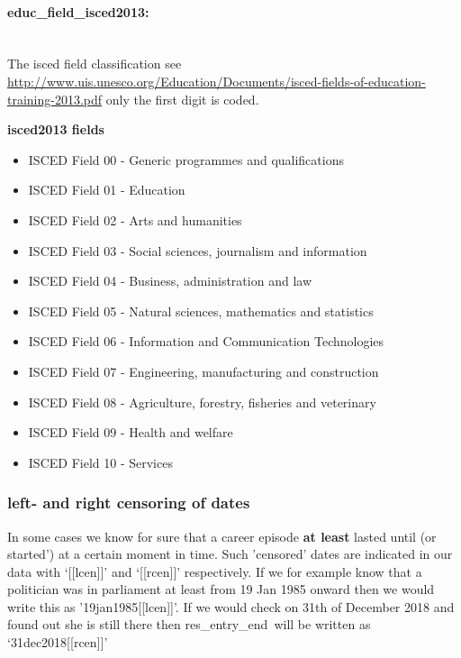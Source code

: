 \documentclass{article}
\begin{document}
\paragraph{educ\_field\_isced2013:}\\ 
    The isced field classification see \url{http://www.uis.unesco.org/Education/Documents/isced-fields-of-education-training-2013.pdf} only the first digit is coded.\par

    \textbf{isced2013 fields}
    \begin{itemize}
    \setlength\itemsep{0em}
        \item ISCED Field 00 - Generic programmes and qualifications
        \item ISCED Field 01 - Education
        \item ISCED Field 02 - Arts and humanities
        \item ISCED Field 03 - Social sciences, journalism and information
        \item ISCED Field 04 - Business, administration and law
        \item ISCED Field 05 - Natural sciences, mathematics and statistics
        \item ISCED Field 06 - Information and Communication Technologies
        \item ISCED Field 07 - Engineering, manufacturing and construction
        \item ISCED Field 08 - Agriculture, forestry, fisheries and veterinary
        \item ISCED Field 09 - Health and welfare
        \item ISCED Field 10 - Services
    \end{itemize}

\subsubsection{left- and right censoring of dates}

    In some cases we know for sure that a career episode \textbf{at least} lasted until (or started') at a certain moment in time. Such 'censored' dates are indicated in our data with `[[lcen]]' and `[[rcen]]' respectively. If we for example know that a politician was in parliament at least from 19 Jan 1985 onward then we would write this as '19jan1985[[lcen]]'. If we would check on 31th of December 2018 and found out she is still there then res\_entry\_end\ will be written as `31dec2018[[rcen]]'
\end{document}
